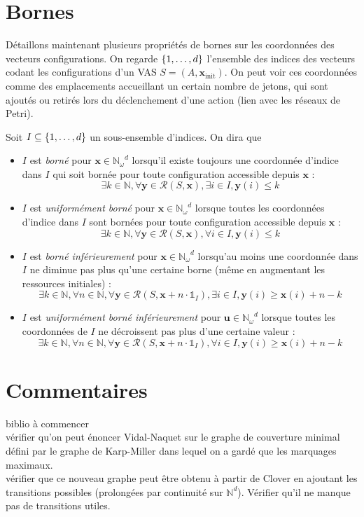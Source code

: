 \documentclass[a4paper,final]{article}
\theoremstyle{definition}
\let\leq\leqslant
\let\geq\geqslant
\newcommand{\os}[1]{\left\{\mathinner{#1}\right\}}
\newcommand{\N}{\ensuremath{\mathbb{N}}}
\newcommand{\Nomega}{\ensuremath{\mathbb{N}_\omega}}
\newcommand{\indicatrice}[1]{\ensuremath{\mathds{1}_{#1}}}
\newcommand{\conf}{\ensuremath{\mathcal{R}}}
\newcommand{\vect}[1]{\ensuremath{\mathbf{#1}}}
\newcommand{\xinit}{\ensuremath{\vect{x}_\text{init}}}
\begin{document}
\section{Bornes}

Détaillons maintenant plusieurs propriétés de bornes sur les coordonnées des vecteurs configurations.
On regarde $\os{1,\dots,d}$ l'ensemble des indices des vecteurs codant les configurations d'un VAS $S=(A,\xinit)$.
On peut voir ces coordonnées comme des emplacements accueillant un certain nombre de jetons, qui sont ajoutés ou retirés lors du déclenchement d'une action (lien avec les réseaux de Petri).

Soit $I\subseteq \os{1,\dots,d}$ un sous-ensemble d'indices.
On dira que
\begin{itemize}
    \item $I$ est \emph{borné} pour $\vect{x}\in \Nomega^d$ lorsqu'il existe toujours une coordonnée d'indice dans $I$ qui soit bornée pour toute configuration accessible depuis $\vect{x}$ :
    $$\exists k\in\N, \forall \vect{y}\in\conf(S,\vect{x}), \exists i\in I, \vect{y}(i)\leq k$$
    
    \item $I$ est \emph{uniformément borné} pour $\vect{x}\in \Nomega^d$ lorsque toutes les coordonnées d'indice dans $I$ sont bornées pour toute configuration accessible depuis $\vect{x}$ :
    $$\exists k\in\N, \forall \vect{y}\in\conf(S,\vect{x}), \forall i\in I, \vect{y}(i)\leq k$$
    
    \item $I$ est \emph{borné inférieurement} pour $\vect{x}\in \Nomega^d$ lorsqu'au moins une coordonnée dans $I$ ne diminue pas plus qu'une certaine borne (même en augmentant les ressources initiales) :
    $$\exists k\in\N, \forall n\in\N, \forall \vect{y}\in\conf(S,\vect{x} + n\cdot\indicatrice{I}), \exists i\in I, \vect{y}(i)\geq \vect{x}(i)+n-k$$
    
    \item $I$ est \emph{uniformément borné inférieurement} pour $\vect{u}\in \Nomega^d$ lorsque toutes les coordonnées de $I$ ne décroissent pas plus d'une certaine valeur :
    $$\exists k\in\N, \forall n\in\N, \forall \vect{y}\in\conf(S,\vect{x} + n\cdot\indicatrice{I}), \forall i\in I, \vect{y}(i)\geq \vect{x}(i)+n-k$$
\end{itemize}

\section{Commentaires}
biblio à commencer\\
vérifier qu'on peut énoncer Vidal-Naquet sur le graphe de couverture minimal défini par le graphe de Karp-Miller dans lequel on a gardé que les marquages maximaux.\\
vérifier que ce nouveau graphe peut être obtenu à partir de Clover en ajoutant les transitions possibles (prolongées par continuité sur $\N^d$). Vérifier qu'il ne manque pas de transitions utiles.
\end{document}
